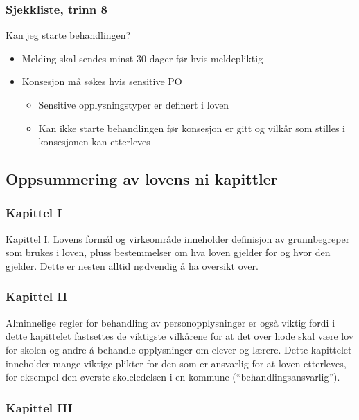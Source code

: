 \documentclass[11pt]{article}
\begin{document}
\subsubsection{Sjekkliste, trinn 8}
\label{sec-17.1.8}

    Kan jeg starte behandlingen?
\begin{itemize}
\item Melding skal sendes minst 30 dager før hvis meldepliktig
\item Konsesjon må søkes hvis sensitive PO

\begin{itemize}
\item Sensitive opplysningstyper er definert i loven
\item Kan ikke starte behandlingen før konsesjon er gitt og vilkår
        som stilles i konsesjonen kan etterleves
\end{itemize}

\end{itemize}
\subsection{Oppsummering av lovens ni kapittler}
\label{sec-17.2}
\subsubsection{Kapittel I}
\label{sec-17.2.1}

    Kapittel I. Lovens formål og virkeområde inneholder definisjon av grunnbegreper 
    som brukes i loven, pluss bestemmelser om hva loven gjelder for og hvor den gjelder. 
    Dette er nesten alltid nødvendig å ha oversikt over.
\subsubsection{Kapittel II}
\label{sec-17.2.2}

    Alminnelige regler for behandling av personopplysninger er også viktig fordi
    i dette kapittelet fastsettes de viktigste vilkårene for at det over hode
    skal være lov for skolen og andre å behandle opplysninger om elever og lærere.
    Dette kapittelet inneholder mange viktige plikter for den som er ansvarlig for
    at loven etterleves, for eksempel den øverste skoleledelsen i en kommune 
    (``behandlingsansvarlig'').
\subsubsection{Kapittel III}
\label{sec-17.2.3}
\end{document}
